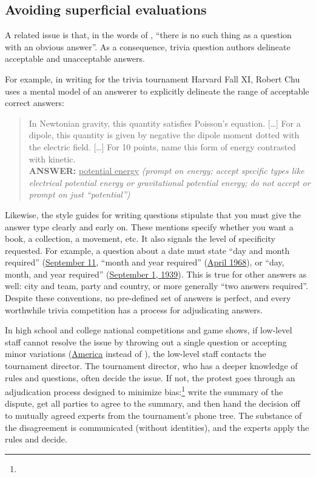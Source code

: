 \subsection{Avoiding superficial evaluations}

A related issue is that, in the words of \citet{voorhees-00}, ``there is no such
thing as a question with an obvious answer''.
As a consequence, trivia question authors 
delineate acceptable and unacceptable answers.

For example, in writing for the trivia tournament Harvard Fall XI, Robert Chu uses a mental model of an answerer to explicitly delineate the range of acceptable correct answers:
\begin{quote}
     In Newtonian gravity, this quantity satisfies Poisson's equation. [\dots] For a dipole, this quantity is given by negative the dipole moment dotted with the electric field. [\dots] For 10 points, name this form of energy contrasted with kinetic.\\
    {\bf ANSWER:} \underline{potential energy} \textit{(prompt on energy; accept specific types like electrical potential energy or gravitational potential energy; do not accept or prompt on just ``potential'')}
\end{quote}

Likewise, the style guides for writing questions stipulate that you
must give the answer type clearly and early on.
These mentions specify whether you want a book, a collection, a movement, etc.  
It also signals the level of specificity requested.  
For example, a question about a date must state ``day and month required'' (\underline{September 11}, ``month and year required'' (\underline{April 1968}), or ``day, month, and year required'' (\underline{September 1, 1939}).
This is true for other answers as well: city and team, party and
country, or more generally ``two answers required''.
Despite these conventions, no pre-defined set of answers is perfect,
and every worthwhile trivia competition has a process for adjudicating
answers.

In high school and college national competitions and game shows,
if low-level staff cannot resolve the issue by throwing out a single
question or accepting minor variations (\underline{America} instead of
\underline{}), the low-level staff contacts the tournament
director.
The tournament director, who has a deeper knowledge of rules and questions, often decide the issue.
If not, the protest goes
through an adjudication process designed to minimize
bias:\footnote{}
write the summary of the dispute,
get all parties to agree to the summary,
and then hand the decision off to mutually agreed experts from the tournament's phone tree.
The substance of the disagreement is communicated (without identities), and the experts apply the rules and decide.

